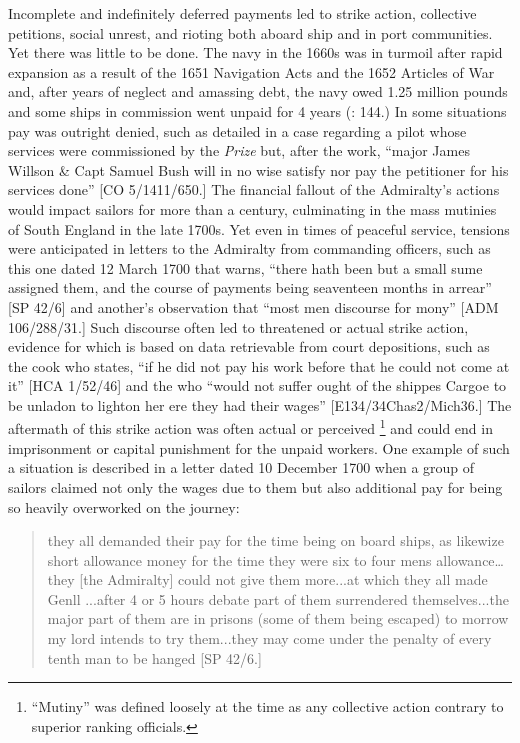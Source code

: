 Incomplete and indefinitely deferred payments led to strike action, collective petitions, social unrest, and rioting both aboard ship and in port communities. Yet there was little to be done. The navy in the 1660s was in turmoil after rapid expansion as a result of the 1651 Navigation Acts and the 1652 Articles of War and, after years of neglect and amassing debt, the navy owed 1.25 million pounds and some ships in commission went unpaid for 4 years (\citealt{Lincoln2015}: 144.) In some situations pay was outright denied, such as detailed in a case regarding a pilot whose services were commissioned by the \textit{ Prize} but, after the work, “major James Willson \& Capt Samuel Bush will in no wise satisfy nor pay the petitioner for his services done” [CO 5/1411/650.] The financial fallout of the Admiralty’s actions would impact sailors for more than a century, culminating in the mass mutinies of South England in the late 1700s. Yet even in times of peaceful service, tensions were anticipated in letters to the Admiralty from commanding officers, such as this one dated 12 March {1700} that warns, “there hath been but a small sume assigned them, and the course of payments being seaventeen months in arrear” [SP 42/6] and another’s observation that “most men discourse for mony” [ADM 106/288/31.] Such discourse often led to threatened or actual strike action, evidence for which is based on data retrievable from court depositions, such as the cook who states, “if he did not pay his work before that he could not come at it” [HCA 1/52/46] and the  who “would not suffer ought of the shippes Cargoe to be unladon to lighton her ere they had their wages” [E134/34Chas2/Mich36.] The aftermath of this strike action was often actual or perceived \footnote{“Mutiny” was defined loosely at the time as any collective action contrary to superior ranking officials.} and could end in imprisonment or capital punishment for the unpaid workers. One example of such a situation is described in a letter dated 10 December {1700} when a group of sailors claimed not only the wages due to them but also additional pay for being so heavily overworked on the journey:

\begin{quotation}
they all demanded their pay for the time being on board ships, as likewize short allowance money for the time they were six to four mens allowance… they [the Admiralty] could not give them more...at which they all made Genll ...after 4 or 5 hours debate part of them surrendered themselves...the major part of them are in prisons (some of them being escaped) to morrow my lord intends to try them...they may come under the penalty of every tenth man to be hanged [SP 42/6.]\end{quotation}

